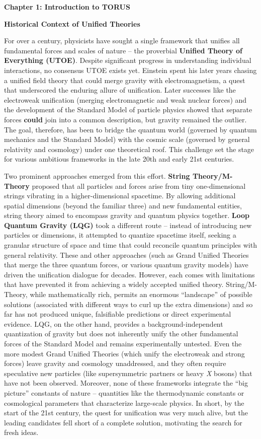 \documentclass[]{article}
\date{}
\begin{document}
\textbf{Chapter 1: Introduction to TORUS}

\textbf{Historical Context of Unified Theories}

For over a century, physicists have sought a single framework that
unifies all fundamental forces and scales of nature -- the proverbial
\textbf{Unified Theory of Everything (UTOE)}. Despite significant
progress in understanding individual interactions, no consensus UTOE
exists yet. Einstein spent his later years chasing a unified field
theory that could merge gravity with electromagnetism, a quest that
underscored the enduring allure of unification. Later successes like the
electroweak unification (merging electromagnetic and weak nuclear
forces) and the development of the Standard Model of particle physics
showed that separate forces \textbf{could} join into a common
description, but gravity remained the outlier. The goal, therefore, has
been to bridge the quantum world (governed by quantum mechanics and the
Standard Model) with the cosmic scale (governed by general relativity
and cosmology) under one theoretical roof. This challenge set the stage
for various ambitious frameworks in the late 20th and early 21st
centuries.

Two prominent approaches emerged from this effort. \textbf{String
Theory/M-Theory} proposed that all particles and forces arise from tiny
one-dimensional strings vibrating in a higher-dimensional spacetime. By
allowing additional spatial dimensions (beyond the familiar three) and
new fundamental entities, string theory aimed to encompass gravity and
quantum physics together. \textbf{Loop Quantum Gravity (LQG)} took a
different route -- instead of introducing new particles or dimensions,
it attempted to quantize spacetime itself, seeking a granular structure
of space and time that could reconcile quantum principles with general
relativity. These and other approaches (such as Grand Unified Theories
that merge the three quantum forces, or various quantum gravity models)
have driven the unification dialogue for decades. However, each comes
with limitations that have prevented it from achieving a widely accepted
unified theory. String/M-Theory, while mathematically rich, permits an
enormous ``landscape'' of possible solutions (associated with different
ways to curl up the extra dimensions) and so far has not produced
unique, falsifiable predictions or direct experimental evidence. LQG, on
the other hand, provides a background-independent quantization of
gravity but does not inherently unify the other fundamental forces of
the Standard Model and remains experimentally untested. Even the more
modest Grand Unified Theories (which unify the electroweak and strong
forces) leave gravity and cosmology unaddressed, and they often require
speculative new particles (like supersymmetric partners or heavy
\emph{X} bosons) that have not been observed. Moreover, none of these
frameworks integrate the ``big picture'' constants of nature --
quantities like the thermodynamic constants or cosmological parameters
that characterize large-scale physics. In short, by the start of the
21st century, the quest for unification was very much alive, but the
leading candidates fell short of a complete solution, motivating the
search for fresh ideas.
\end{document}
